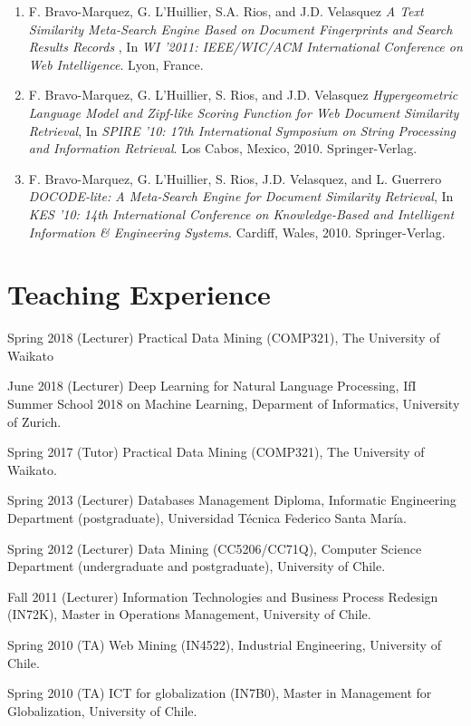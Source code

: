 \documentclass[letterpaper]{article}
\begin{document}
\begin{enumerate}
\item F. Bravo-Marquez, G. L'Huillier, S.A. Rios, and J.D. Velasquez \textit{A Text Similarity Meta-Search Engine Based on Document Fingerprints and Search Results Records} , In \textit{WI '2011: IEEE/WIC/ACM International Conference on Web Intelligence}. Lyon, France. 

\item F. Bravo-Marquez, G. L'Huillier, S. Rios, and J.D. Velasquez  \textit{Hypergeometric Language Model and Zipf-like Scoring Function for Web Document Similarity Retrieval}, In \textit{SPIRE '10: 17th International Symposium on String Processing and Information Retrieval}. Los Cabos, Mexico, 2010. Springer-Verlag.

\item F. Bravo-Marquez, G. L'Huillier, S. Rios, J.D. Velasquez, and L. Guerrero  \textit{DOCODE-lite: A Meta-Search Engine for Document Similarity Retrieval}, In \textit{KES '10: 14th International Conference on Knowledge-Based and Intelligent Information \& Engineering Systems}. Cardiff, Wales, 2010. Springer-Verlag.

\end{enumerate}



\section{Teaching Experience}

\begin{CV}

\item [Spring 2018] (Lecturer) Practical Data Mining (COMP321), The University of Waikato

\item [June 2018] (Lecturer) Deep Learning for Natural Language Processing, IfI Summer School 2018 on Machine Learning,  Deparment of Informatics, University of Zurich. 

\item[Spring 2017] (Tutor) Practical Data Mining (COMP321), The University of Waikato.

\item[Spring 2013] (Lecturer) Databases Management Diploma, Informatic Engineering Department (postgraduate), Universidad Técnica Federico Santa María.

\item[Spring 2012] (Lecturer) Data Mining (CC5206/CC71Q), Computer Science Department (undergraduate and postgraduate), University of Chile.

\item[Fall 2011]   (Lecturer) Information Technologies and Business Process Redesign (IN72K), Master in Operations Management, University of Chile.

\item[Spring 2010]  (TA) Web Mining (IN4522), Industrial Engineering, University of Chile.

\item[Spring 2010]  (TA) ICT for globalization (IN7B0), Master in Management for Globalization, University of Chile.


\end{CV}
\end{document}

